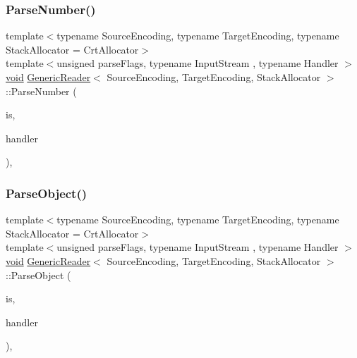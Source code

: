 \subsubsection{\texorpdfstring{Parse\+Number()}{ParseNumber()}}
{\footnotesize\ttfamily template$<$typename Source\+Encoding, typename Target\+Encoding, typename Stack\+Allocator = Crt\+Allocator$>$ \\
template$<$unsigned parse\+Flags, typename Input\+Stream , typename Handler $>$ \\
\hyperlink{imgui__impl__opengl3__loader_8h_ac668e7cffd9e2e9cfee428b9b2f34fa7}{void} \hyperlink{classGenericReader}{Generic\+Reader}$<$ Source\+Encoding, Target\+Encoding, Stack\+Allocator $>$\+::Parse\+Number (\begin{DoxyParamCaption}\item[{Input\+Stream \&}]{is,  }\item[{Handler \&}]{handler }\end{DoxyParamCaption})\hspace{0.3cm}{\ttfamily [inline]}, {\ttfamily [private]}}

\mbox{\label{classGenericReader_af7943451d58ae465e9803d5a78beeb90}} 
\subsubsection{\texorpdfstring{Parse\+Object()}{ParseObject()}}
{\footnotesize\ttfamily template$<$typename Source\+Encoding, typename Target\+Encoding, typename Stack\+Allocator = Crt\+Allocator$>$ \\
template$<$unsigned parse\+Flags, typename Input\+Stream , typename Handler $>$ \\
\hyperlink{imgui__impl__opengl3__loader_8h_ac668e7cffd9e2e9cfee428b9b2f34fa7}{void} \hyperlink{classGenericReader}{Generic\+Reader}$<$ Source\+Encoding, Target\+Encoding, Stack\+Allocator $>$\+::Parse\+Object (\begin{DoxyParamCaption}\item[{Input\+Stream \&}]{is,  }\item[{Handler \&}]{handler }\end{DoxyParamCaption})\hspace{0.3cm}{\ttfamily [inline]}, {\ttfamily [private]}}

\mbox{\label{classGenericReader_ab4d4f63b23b55a72069e2e13eb010cff}} 
